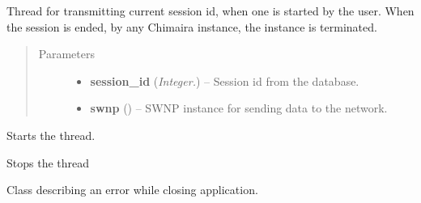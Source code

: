 \documentclass[letterpaper,10pt,english]{sphinxmanual}
\begin{document}

\begin{fulllineitems}
\label{api:wos.CURRENT_SESSION}
Thread for transmitting current session id, when one is started by
the user.  When the session is ended, by any Chimaira instance, the
instance is terminated.
\begin{quote}\begin{description}
\item[{Parameters}] \leavevmode\begin{itemize}
\item {} 
\textbf{session\_id} (\emph{Integer.}) -- Session id from the database.

\item {} 
\textbf{swnp} ({\hyperref[api:swnp.SWNP]{}}) -- SWNP instance for sending data to the network.

\end{itemize}

\end{description}\end{quote}

\begin{fulllineitems}
\label{api:wos.CURRENT_SESSION.run}
Starts the thread.

\end{fulllineitems}


\begin{fulllineitems}
\label{api:wos.CURRENT_SESSION.stop}
Stops the thread

\end{fulllineitems}


\end{fulllineitems}


\begin{fulllineitems}
\label{api:wos.CloseError}
Class describing an error while closing application.

\end{fulllineitems}
\end{document}
